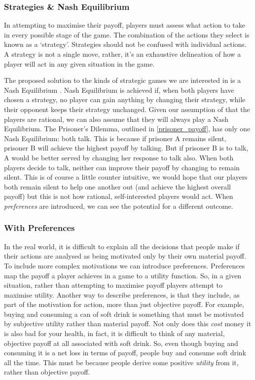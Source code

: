 \documentclass[11pt]{article}
\newcommand*{\np}{\par\noindent\newline}
\begin{document}
\subsubsection{Strategies \& Nash Equilibrium}
In attempting to maximise their payoff, players must assess what action to take
in every possible stage of the game. The combination of the actions they select
is known as a `strategy'. Strategies should not be confused with individual
actions. A strategy is not a single move, rather, it's an exhaustive
delineation of how a player will act in any given situation in the game. 

\np The proposed solution to the kinds of strategic games we are interested in
is a Nash Equilibrium \cite{angner_course_2012}. Nash Equilibrium is achieved
if, when both players have chosen a strategy, no player can gain anything by
changing their strategy, while their opponent keeps their strategy unchanged.
Given our assumption of that the players are rational, we can also assume that
they will always play a Nash Equilibrium. The Prisoner's Dilemma, outlined in
\ref{prisoner_payoff}, has only one Nash Equilibrium: both talk. This is
because if prisoner A remains silent, prisoner B will achieve the highest
payoff by talking. But if prisoner B is to talk, A would be better served by
changing her response to talk also. When both players decide to talk, neither
can improve their payoff by changing to remain silent. This is of course a
little counter intuitive, we would hope that our players both remain silent to
help one another out (and achieve the highest overall payoff) but this is not
how rational, self-interested players would act. When \textit{preferences} are
introduced, we can see the potential for a different outcome.

\subsubsection{With Preferences}
In the real world, it is difficult to explain all the decisions that people
make if their actions are analysed as being motivated only by their own
material payoff. To include more complex motivations we can introduce
preferences. Preferences map the payoff a player achieves in a game to a
utility function. So, in a given situation, rather than attempting to maximise
payoff players attempt to maximise utility. Another way to describe
preferences, is that they include, as part of the motivation for action, more
than just objective payoff. For example, buying and consuming a can of soft
drink is something that must be motivated by subjective utility rather than
material payoff. Not only does this \textit{cost} money it is also bad for your
health, in fact, it is difficult to think of any material, objective payoff at
all associated with soft drink. So, even though buying and consuming it is a
net loss in terms of payoff, people buy and consume soft drink all the time.
This must be because people derive some positive \textit{utility} from it,
rather than objective payoff.
\end{document}
